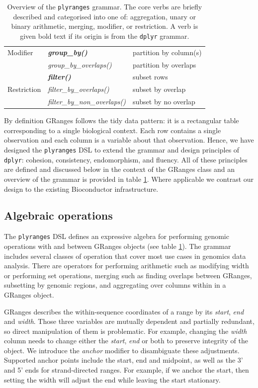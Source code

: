 \documentclass[10pt,letterpaper]{article}
\begin{document}
\begin{table}[!htbp]
\begin{tabular}{|l|l|p{4cm}|}
  Modifier & \textbf{\emph{group\_by()}} & partition by column(s)  \\ 
   & \emph{group\_by\_overlaps()} & partition by overlaps \\
   \hline
   & \textbf{\emph{filter()}} & subset rows \\
  Restriction & \emph{filter\_by\_overlaps()} & subset by overlap \\
    & \emph{filter\_by\_non\_overlaps()} & subset by no overlap \\
   \hline
\end{tabular}
\caption{Overview of the \texttt{plyranges} grammar. The core verbs are
briefly described and categorised into one of: aggregation, unary or binary
arithmetic, merging, modifier, or restriction. A verb is given bold text if
its origin is from the \texttt{dplyr} grammar.}\label{tab:grammar}
\end{table}

By definition GRanges follows the tidy data pattern: it is a rectangular
table corresponding to a single biological context. Each row contains a
single observation and each column is a variable about that observation.
Hence, we have designed the \texttt{plyranges} DSL to extend the grammar
and design principles of \texttt{dplyr}: cohesion, consistency,
endomorphism, and fluency. All of these principles are defined and
discussed below in the context of the GRanges class and an overview of
the grammar is provided in table \ref{tab:grammar}. Where applicable we
contrast our design to the existing Bioconductor infrastructure.

\hypertarget{algebraic-operations}{%
\subsection{Algebraic operations}\label{algebraic-operations}}

The \texttt{plyranges} DSL defines an expressive algebra for performing
genomic operations with and between GRanges objects (see table
\ref{tab:grammar}). The grammar includes several classes of operation
that cover most use cases in genomics data analysis. There are operators
for performing arithmetic such as modifying width or performing set
operations, merging such as finding overlaps between GRanges, subsetting
by genomic regions, and aggregating over columns within in a GRanges
object.

GRanges describes the within-sequence coordinates of a range by its
\emph{start}, \emph{end} and \emph{width}. Those three variables are
mutually dependent and partially redundant, so direct manipulation of
them is problematic. For example, changing the \emph{width} column needs
to change either the \emph{start}, \emph{end} or both to preserve
integrity of the object. We introduce the \emph{anchor} modifier to
disambiguate these adjustments. Supported anchor points include the
start, end and midpoint, as well as the 3' and 5' ends for
strand-directed ranges. For example, if we anchor the start, then
setting the width will adjust the end while leaving the start
stationary.
\end{document}
